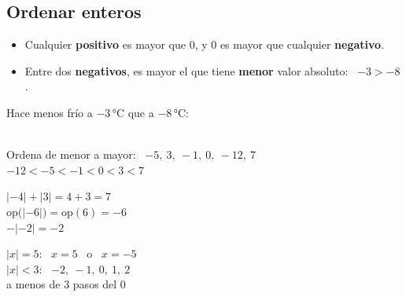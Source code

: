 \documentclass[11pt,a4paper]{article}
\newcommand{\comic}{\fontfamily{ComicNeue-TLF}\selectfont}
\newcommand{\nota}[1]{{\comic\small\color{fmex!85!black}#1}}
\newcommand{\recta}[2]{\draw[-{Latex[length=2.5mm]},fmnavy,line width=1.1pt] (#1-0.6,0) -- (#2+0.6,0);
  \foreach \k in {#1,...,#2} {\draw[fmnavy,line width=0.9pt] (\k,-0.12) -- (\k,0.12); \node[below=3pt,font=\small] at (\k,0) {$\k$};}}
\begin{document}
\vfill
\subsection{Ordenar enteros}
\begin{minipage}[t]{0.52\linewidth}
\begin{idea}
\begin{itemize}[leftmargin=1em]
\item Cualquier \textbf{positivo} es mayor que 0, y 0 es mayor que cualquier \textbf{negativo}.
\item Entre dos \textbf{negativos}, es mayor el que tiene \textbf{menor} valor absoluto: \ $-3>-8$.
\end{itemize}
\end{idea}
\end{minipage}\hfill
\begin{minipage}[t]{0.45\linewidth}
\begin{truc}
Hace menos frío a $-3$\,°C que a $-8$\,°C:\\[3pt]
\hspace*{1em}{\Large$-3>-8$} \ \ {\color{fmA}\Large\faThermometerQuarter}
\end{truc}
\end{minipage}

\vfill
\begin{exemple}[Ejemplos]
\begin{minipage}[t]{0.5\linewidth}
Ordena de menor a mayor: \ $-5,\ 3,\ -1,\ 0,\ -12,\ 7$\\[4pt]
{\large$-12<-5<-1<0<3<7$}
\end{minipage}\hfill
\begin{minipage}[t]{0.47\linewidth}
$|-4|+|3|=4+3=7$\\[3pt]
$\text{op}\big(|-6|\big)=\text{op}(6)=-6$\\[3pt]
$-|-2|=-2$
\end{minipage}
\end{exemple}

\vfill
\begin{exemple}[Ejemplo: \ ¿qué enteros cumplen \ $|x|=5$? \ ¿Y \ $|x|<3$?]
\begin{minipage}[c]{0.38\linewidth}
$|x|=5$: \ $\boxed{x=5}$ \ o \ $\boxed{x=-5}$\\[6pt]
$|x|<3$: \ $\boxed{-2,\ -1,\ 0,\ 1,\ 2}$\\[3pt]
\nota{a menos de 3 pasos del 0}
\end{minipage}\hfill
\begin{minipage}[c]{0.6\linewidth}\centering
{}
\end{minipage}
\end{exemple}
\end{document}
